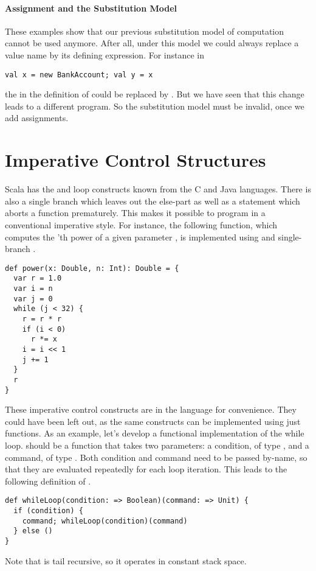 \paragraph{Assignment and the Substitution Model}
These examples show that our previous substitution model of
computation cannot be used anymore.  After all, under this
model we could always replace a value name by its
defining expression.
For instance in
\begin{lstlisting}
val x = new BankAccount; val y = x
\end{lstlisting}
the  in the definition of  could
be replaced by .
But we have seen that this change leads to a different program.
So the substitution model must be invalid, once we add assignments. 

\section{Imperative Control Structures}

Scala has the  and  loop constructs known
from the C and Java languages. There is also a single branch 
which leaves out the else-part as well as a  statement which
aborts a function prematurely. This makes it possible to program in a
conventional imperative style. For instance, the following function,
which computes the 'th power of a given parameter , is
implemented using  and single-branch .
\begin{lstlisting}
def power(x: Double, n: Int): Double = {
  var r = 1.0
  var i = n
  var j = 0
  while (j < 32) {
    r = r * r
    if (i < 0)
      r *= x
    i = i << 1
    j += 1
  }
  r
}
\end{lstlisting}
These imperative control constructs are in the language for
convenience. They could have been left out, as the same constructs can
be implemented using just functions. As an example, let's develop a
functional implementation of the while loop.  should
be a function that takes two parameters: a condition, of type
, and a command, of type . Both condition and
command need to be passed by-name, so that they are evaluated
repeatedly for each loop iteration.  This leads to the following
definition of .
\begin{lstlisting}
def whileLoop(condition: => Boolean)(command: => Unit) {
  if (condition) {
    command; whileLoop(condition)(command)
  } else ()
}
\end{lstlisting}
Note that  is tail recursive, so it operates in
constant stack space.

